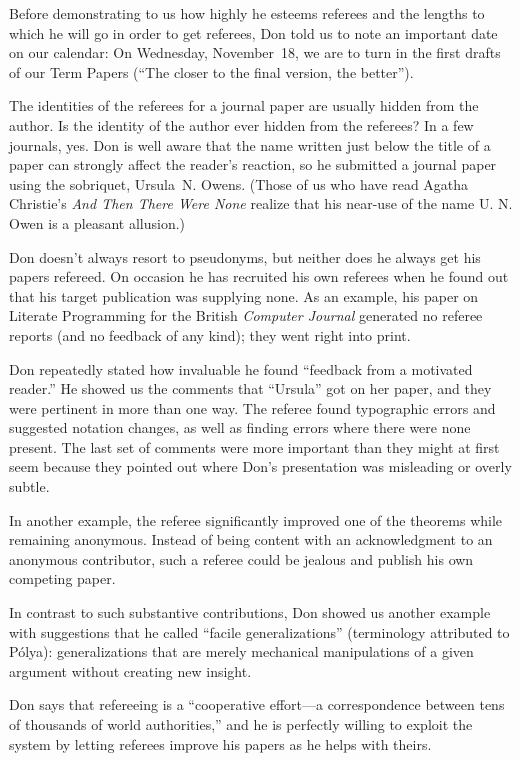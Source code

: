 Before demonstrating to us how highly he esteems referees and the lengths
to which he will go in order to get referees, Don told us to note an
important date on our calendar: On Wednesday, November~18, we are to
turn in the first drafts of our Term Papers (``The closer to the final
version, the better'').

The identities of the referees for a journal paper are usually hidden from
the author.  Is the identity of the author ever hidden from the referees?
In a few journals, yes.
 Don is well aware that the name written just below
the title of a paper can strongly affect the reader's reaction, so he
submitted a journal paper using the sobriquet, Ursula~N. Owens.  (Those of
us who have read Agatha Christie's {\sl And Then There Were None\/} realize
that his near-use of the name U. N. Owen is a pleasant allusion.)

Don doesn't always resort to pseudonyms, but neither does he always get
his papers refereed.  On occasion he has recruited his own referees when
he found out that his target publication was supplying none.  As an
example, his paper on Literate Programming for the British {\sl Computer
Journal\/} generated no referee reports (and no
feedback of any kind); they went right into print.

Don repeatedly stated how invaluable he found ``feedback from a motivated
reader.'' He showed us the comments that ``Ursula'' got on her paper, and
they were pertinent in more than one way.  The referee found typographic
errors and suggested notation changes, as well as finding errors where
there were none present.  The last set of comments were more important
than they might at first seem because they pointed out where Don's
presentation was misleading or overly subtle.  

In another example, the referee significantly improved one of the theorems
while remaining anonymous.  Instead of being content with an
acknowledgment to an anonymous contributor, such a referee could be
jealous and publish his own competing paper.  

In contrast to such substantive contributions, Don showed us another
example with suggestions that he called ``facile generalizations''
(terminology attributed to P\'olya): generalizations that are merely
mechanical manipulations of a given argument without creating new insight.

Don says that refereeing is a ``cooperative effort---a correspondence
between tens of thousands of
world authorities,'' and he is perfectly willing to exploit the system
by letting referees improve his papers as he helps with theirs.

